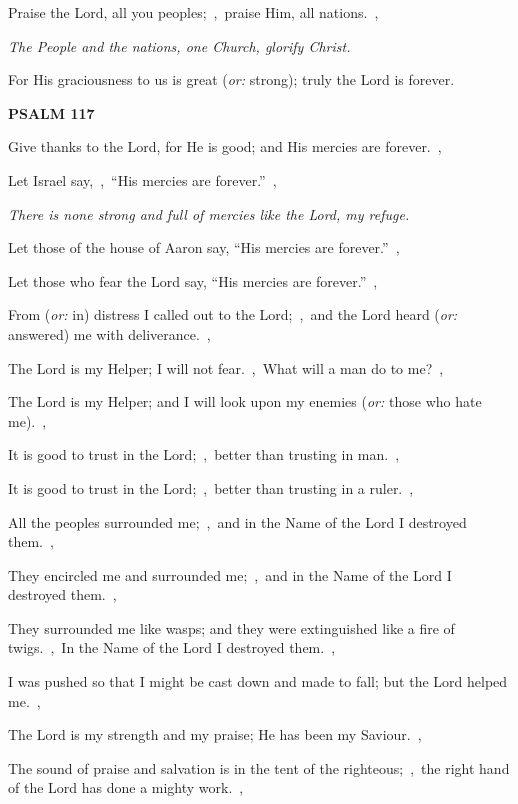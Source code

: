 \documentclass[12pt,twoside,a5paper]{article}
\newcommand{\psalm}[1]{\textbf{PSALM {#1}}\nopagebreak}
\newcommand{\qanona}[1]{{\liturgicalhint{Qanona.} \emph{#1}}}
\newcommand{\translationoption}[1]{\emph{or:} #1}
\begin{document}
\begin{normalparskip}
  Praise the Lord, all you peoples;~\sep\ praise Him, all nations.~\sep

  \qanona{The People and the nations, one Church, glorify Christ.}

  For His graciousness to us is great (\translationoption{strong}); truly the Lord is forever.
\end{normalparskip}

\psalm{117}

\begin{normalparskip}
  Give thanks to the Lord, for He is good; and His mercies are forever.~\sep

  Let Israel say,~\sep\ ``His mercies are forever.''~\sep

  \qanona{There is none strong and full of mercies like the Lord, my refuge.}

  Let those of the house of Aaron say, ``His mercies are forever.''~\sep

  Let those who fear the Lord say, ``His mercies are forever.''~\sep

  From (\translationoption{in}) distress I called out to the Lord;~\sep\ and the Lord heard (\translationoption{answered}) me with deliverance.~\sep

  The Lord is my Helper; I will not fear.~\sep\ What will a man do to me?~\sep

  The Lord is my Helper; and I will look upon my enemies (\translationoption{those who hate me}).~\sep

  It is good to trust in the Lord;~\sep\ better than trusting in man.~\sep

  It is good to trust in the Lord;~\sep\ better than trusting in a ruler.~\sep

  All the peoples surrounded me;~\sep\ and in the Name of the Lord I destroyed them.~\sep

  They encircled me and surrounded me;~\sep\ and in the Name of the Lord I destroyed them.~\sep

  They surrounded me like wasps; and they were extinguished like a fire of twigs.~\sep\ In the Name of the Lord I destroyed them.~\sep

  I was pushed so that I might be cast down and made to fall; but the Lord helped me.~\sep

  The Lord is my strength and my praise; He has been my Saviour.~\sep

  The sound of praise and salvation is in the tent of the righteous;~\sep\ the right hand of the Lord has done a mighty work.~\sep


\end{normalparskip}
\end{document}
